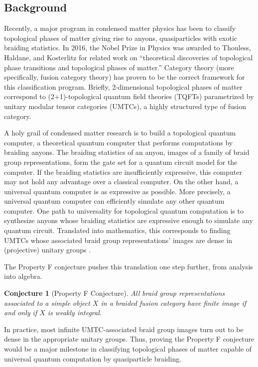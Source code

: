 \documentclass[12pt]{article}
\newtheorem{conjecture}{Conjecture}
\theoremstyle{definition}
\begin{document}
\subsection*{Background}

Recently, a major program in condensed matter physics has been to classify topological phases of matter giving rise to anyons, quasiparticles with exotic braiding statistics. In 2016, the Nobel Prize in Physics was awarded to Thouless, Haldane, and Kosterlitz for related work on ``theoretical discoveries of topological phase transitions and topological phases of matter.'' Category theory (more specifically, fusion category theory) has proven to be the correct framework for this classification program. Briefly, 2-dimensional topological phases of matter correspond to (2+1)-topological quantum field theories (TQFTs) parametrized by unitary modular tensor categories (UMTCs), a highly structured type of fusion category. 

A holy grail of condensed matter research is to build a topological quantum computer, a theoretical quantum computer that performs computations by braiding anyons. The braiding statistics of an anyon, images of a family of braid group representations, form the gate set for a quantum circuit model for the computer. If the braiding statistics are insufficiently expressive, this computer may not hold any advantage over a classical computer. On the other hand, a universal quantum computer is as expressive as possible. More precisely, a universal quantum computer can efficiently simulate any other quantum computer.  One path to universality for topological quantum computation is to synthesize anyons whose braiding statistics are expressive enough to simulate any quantum circuit.  Translated into mathematics, this corresponds to finding UMTCs whose associated braid group representations' images are dense in (projective) unitary groups \cite{flw}.

The Property F conjecture \cite{nr} pushes this translation one step further, from analysis into algebra.
\begin{conjecture}[Property F Conjecture]
  All braid group representations associated to a simple object $X$ in a braided fusion category have finite image if and only if $X$ is weakly integral.
\end{conjecture}

  In practice, most infinite UMTC-associated braid group images turn out to be dense in the appropriate unitary groups.  Thus, proving the Property F conjecture would be a major milestone in classifying topological phases of matter capable of universal quantum computation by quasiparticle braiding.
\end{document}
